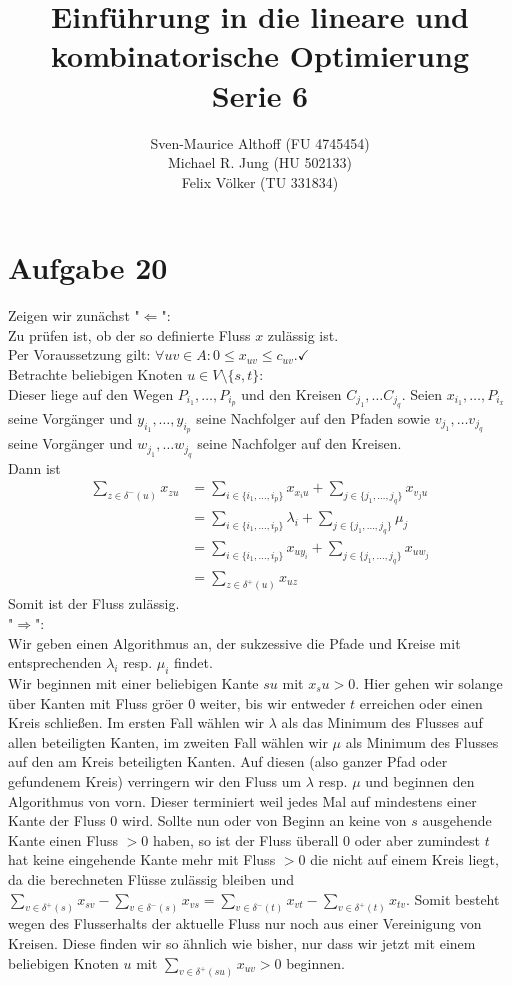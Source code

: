 \documentclass[a4paper,12pt,german]{scrartcl}
\title{Einführung in die lineare und kombinatorische Optimierung\\
Serie 6}
\author{Sven-Maurice Althoff (FU 4745454)\\Michael R. Jung (HU 502133)\\Felix Völker (TU 331834)}
\begin{document}
\maketitle

\section*{Aufgabe 20}
Zeigen wir zunächst "$\Leftarrow$":\\
Zu prüfen ist, ob der so definierte Fluss $x$ zulässig ist.\\
Per Voraussetzung gilt: $\forall uv\in A:0\leq x_{uv}\leq c_{uv}.\checkmark$\\
Betrachte beliebigen Knoten $u\in V\setminus \{s,t\}$:\\
Dieser liege auf den Wegen $P_{i_1},\dots,P_{i_p}$ und den Kreisen $C_{j_1},\dots C_{j_q}$.
Seien $x_{i_1},\dots,P_{i_x}$ seine Vorgänger und $y_{i_1},\dots,y_{i_p}$ seine Nachfolger auf den Pfaden sowie $v_{j_1},\dots v_{j_q}$ seine Vorgänger und $w_{j_1},\dots w_{j_q}$ seine Nachfolger auf den Kreisen.\\
Dann ist \begin{align*}
\sum\limits_{z\in\delta^-(u)}x_{zu}
&=\sum\limits_{i\in\{i_1,\dots,i_p\}}x_{x_iu}+ \sum\limits_{j\in\{j_1,\dots,j_q\}}x_{v_ju}\\
&=\sum\limits_{i\in\{i_1,\dots,i_p\}}\lambda_i+ \sum\limits_{j\in\{j_1,\dots,j_q\}}\mu_j\\
&=\sum\limits_{i\in\{i_1,\dots,i_p\}}x_{uy_i}+ \sum\limits_{j\in\{j_1,\dots,j_q\}}x_{uw_j}\\
&=\sum\limits_{z\in\delta^+(u)}x_{uz}
\end{align*}
Somit ist der Fluss zulässig.\\
"$\Rightarrow$":\\
Wir geben einen Algorithmus an, der sukzessive die Pfade und Kreise mit entsprechenden $\lambda_i$ resp. $\mu_i$ findet.\\
Wir beginnen mit einer beliebigen Kante $su$ mit $x_su>0$. Hier gehen wir solange  über Kanten mit Fluss gröer 0 weiter, bis wir entweder $t$ erreichen oder einen Kreis schließen. Im ersten Fall wählen wir $\lambda$ als das Minimum des Flusses auf allen beteiligten Kanten, im zweiten Fall wählen wir $\mu$ als Minimum des Flusses auf den am Kreis beteiligten Kanten. Auf diesen (also ganzer Pfad oder gefundenem Kreis) verringern wir den Fluss um $\lambda$ resp. $\mu$ und beginnen den Algorithmus von vorn. Dieser terminiert weil jedes Mal auf mindestens einer Kante der Fluss 0 wird. Sollte nun oder von Beginn an keine von $s$ ausgehende Kante einen Fluss $>0$ haben, so ist der Fluss überall $0$ oder aber zumindest $t$ hat keine eingehende Kante mehr mit Fluss $>0$ die nicht auf einem Kreis liegt, da die berechneten Flüsse zulässig bleiben und $\sum\limits_{v\in\delta^+(s)}x_{sv}-\sum\limits_{v\in\delta^-(s)}x_{vs} =\sum\limits_{v\in\delta^-(t)}x_{vt}-\sum\limits_{v\in\delta^+(t)}x_{tv}$.
Somit besteht wegen des Flusserhalts der aktuelle Fluss nur noch aus einer Vereinigung von Kreisen. Diese finden wir so ähnlich wie bisher, nur dass wir jetzt mit einem beliebigen Knoten $u$ mit $\sum\limits_{v\in\delta^+(su)}x_{uv}>0$ beginnen.
\end{document}
